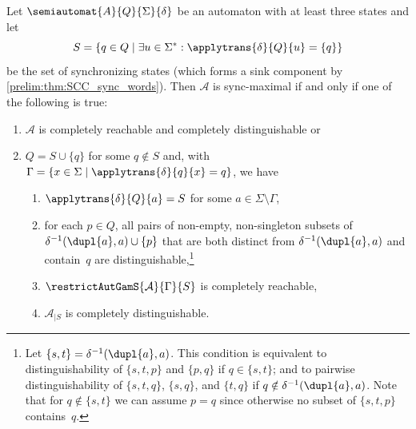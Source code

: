 \begin{theorem}
\label{sync_maximal:thm:structure}
	Let $\semiautomat{A}{Q}{\Sigma}{\delta}$
	be an automaton with at least three states
	and let
	\[
	S = \{ q \in Q \mid \exists u \in \Sigma^* : \applytrans{\delta}{Q}{u} = \{q\}\}
	\]
	be the set of synchronizing states (which forms a sink component by \cref{prelim:thm:SCC_sync_words}).
	Then $\mathcal A$ is sync-maximal if and only if 
	one of the following is true:
	\begin{enumerate}
		\item \label{sync_maximal:thm:structure:1} $\mathcal A$ is completely reachable and completely distinguishable or
		
		\item \label{sync_maximal:thm:structure:item:2nd} $Q = S \cup \{q\}$ for some $q \notin S$
		and, with $\Gamma = \{ x \in \Sigma \mid \applytrans{\delta}{q}{x} = q\}$, we have	
		\begin{enumerate}
			\item \label{sync_maximal:thm:structure:item:defone}
			$\applytrans{\delta}{Q}{a} = S$ for some $a \in \Sigma \setminus \Gamma$,
					
            \item \label{sync_maximal:thm:structure:item:AB} \label{sync_maximal:thm:structure:item:dupl-set} 
            for each $p \in Q$, all pairs of non-empty, non-singleton subsets
            of $\delta^{-1}(\dupl{a}, a) \cup \{p\}$ that are both distinct from
            $\delta^{-1}(\dupl{a}, a)$ and contain~$q$ are distinguishable,\footnote{Let $\{s,t\} = \delta^{-1}(\dupl{a}, a)$. This condition is equivalent
            	to distinguishability of $\{s,t,p\}$
            	and $\{p,q\}$ if $q \in \{s,t\}$;
            	and to pairwise 
            	distinguishability
            	of $\{s,t, q\}$, $\{s, q\}$,
            	and $\{t, q\}$ 
            	if $q \notin \delta^{-1}(\dupl{a}, a)$.
            	Note that for $q \notin \{s,t\}$
            	we can assume $p = q$ since otherwise no
            	subset of $\{s,t,p\}$ contains~$q$.}
                     				
			\item \label{sync_maximal:thm:structure:item:complreach} $\restrictAutGamS{\mathcal A}{\Gamma}{S}$ is completely reachable,
			
			\item \label{sync_maximal:thm:structure:item:compldist} $\mathcal A_{|S}$ is completely distinguishable.			
		\end{enumerate}
	\end{enumerate}
\end{theorem} 
